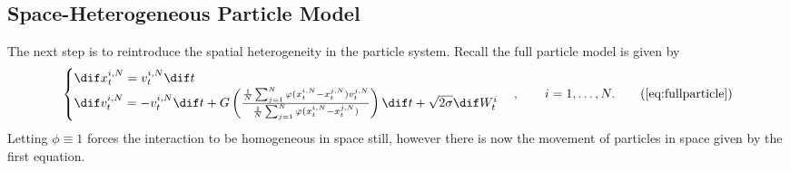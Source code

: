 \subsection{Space-Heterogeneous Particle Model}\label{sec:hetkin}
    The next step is to reintroduce the spatial heterogeneity in the particle system. Recall the full particle model is given by
            \begin{equation}\begin{cases}
    \dif x^{i,N}_t = v^{i,N}_t\dif t\\
    \dif v^{i,N}_t = -v^{i,N}_t\dif t + G\left(\frac{\frac{1}{N}\sum_{j=1}^N \phi(x_t^{i,N} - x_t^{j,N})v^{j,N}_t  }{\frac{1}{N}\sum_{j=1}^N \phi(x_t^{i,N} - x_t^{j,N})}\right)\dif t + \sqrt{2\sigma} \dif W^i_t 
    \end{cases}, \qquad  i = 1,\dots,N.\tag{\ref{eq:fullparticle}}
    \end{equation} 
    Letting $\phi\equiv 1$ forces the interaction to be homogeneous in space still, however there is now the movement of particles in space given by the first equation. 
    